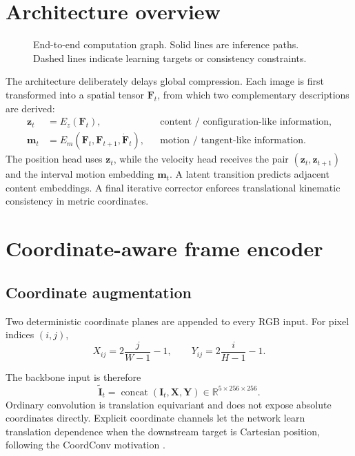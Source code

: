 \documentclass[11pt,a4paper]{article}
\newcommand{\R}{\mathbb{R}}\newcommand{\norm}[1]{\left\lVert #1\right\rVert}\newcommand{\E}{\mathbb{E}}\newcommand{\dt}{\Delta t}
\begin{document}
\section{Architecture overview}
\begin{figure}
	\centering
	
	\caption{End-to-end computation graph. Solid lines are inference paths. Dashed lines indicate learning targets or consistency constraints.}
	\label{fig:overview}
\end{figure}

The architecture deliberately delays global compression. Each image is first transformed into a spatial tensor $\bm F_t$, from which two complementary descriptions are derived:
\begin{align}
\bm z_t &= E_z(\bm F_t), &&\text{content / configuration-like information},\\
\bm m_t &= E_m(\bm F_t,\bm F_{t+1},\dot{\bm F}_t), &&\text{motion / tangent-like information}.
\end{align}
The position head uses $\bm z_t$, while the velocity head receives the pair $(\bm z_t,\bm z_{t+1})$ and the interval motion embedding $\bm m_t$. A latent transition predicts adjacent content embeddings. A final iterative corrector enforces translational kinematic consistency in metric coordinates.

\section{Coordinate-aware frame encoder}
\subsection{Coordinate augmentation}
Two deterministic coordinate planes are appended to every RGB input. For pixel indices $(i,j)$,
\begin{equation}
X_{ij}=2\frac{j}{W-1}-1,\qquad Y_{ij}=2\frac{i}{H-1}-1.
\end{equation}

The backbone input is therefore
\begin{equation}
\widetilde{\bm I}_t=\operatorname{concat}(\bm I_t,\bm X,\bm Y)
\in\R^{5\times256\times256}.
\end{equation}
Ordinary convolution is translation equivariant and does not expose absolute coordinates directly. Explicit coordinate channels let the network learn translation dependence when the downstream target is Cartesian position, following the CoordConv motivation \cite{liu2018coordconv}.
\end{document}
